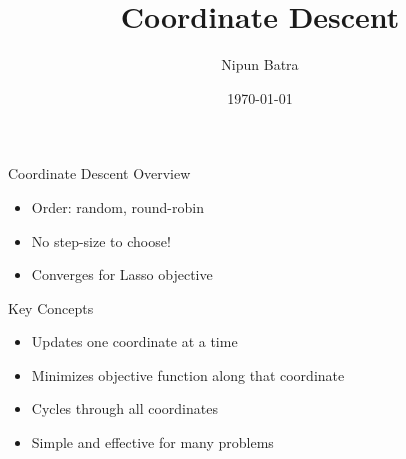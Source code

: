 \documentclass{beamer}
\title{Coordinate Descent}
\date{\today}
\author{Nipun Batra}
\institute{IIT Gandhinagar}
\begin{document}
\maketitle

\begin{frame}{Coordinate Descent Overview}
\begin{itemize}
	\item Order: random, round-robin
	\item No step-size to choose!
	\item Converges for Lasso objective
\end{itemize}
\end{frame}

\begin{frame}{Key Concepts}
\begin{itemize}
	\item Updates one coordinate at a time
	\item Minimizes objective function along that coordinate
	\item Cycles through all coordinates
	\item Simple and effective for many problems
\end{itemize}
\end{frame}
\end{document}
